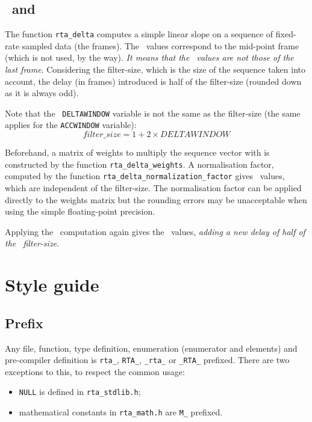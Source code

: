 \documentclass[a4paper, twoside]{article}
\begin{document}
\subsection{\Del\ and \ddel\  \mfcc}
\label{sec:delta_mfcc}

The function \texttt{rta\_delta} computes a simple linear slope on a
sequence of fixed-rate sampled data (the frames). The \del\ values
correspond to the mid-point frame (which is not used, by the
way). \emph{It means that the \del\ values are not those of the last
  frame}. Considering the filter-size, which is the size of the
sequence taken into account, the delay (in frames) introduced is half
of the filter-size (rounded down as it is always odd).

Note that the \htk\ \texttt{DELTAWINDOW} variable is not the same as
the filter-size (the same applies for the \texttt{ACCWINDOW}
variable):
$$ filter\_size = 1 + 2 \times DELTAWINDOW $$

Beforehand, a matrix of weights to multiply the sequence vector with
is constructed by the function \texttt{rta\_delta\_weights}. A
normalisation factor, computed by the function
\texttt{rta\_delta\_normalization\_factor} gives \del\ values, which
are independent of the filter-size. The normalisation factor can be
applied directly to the weights matrix but the rounding errors may be
unacceptable when using the simple floating-point precision.

Applying the \del\ computation again gives the \ddel\ values,
\emph{adding a new delay of half of the \ddel\ filter-size}.

\section{Style guide}
\label{sec:style_guide}

\subsection{Prefix}
\label{sec:prefix}

Any file, function, type definition, enumeration (enumerator and
elements) and pre-compiler definition is \texttt{rta\_},
\texttt{RTA\_}, \texttt{\_rta\_} or \texttt{\_RTA\_} prefixed. There are
two exceptions to this, to respect the common usage:
\begin{itemize}
\item \texttt{NULL} is defined in \texttt{rta\_stdlib.h};
\item mathematical constants in \texttt{rta\_math.h} are \texttt{M\_}
  prefixed.
\end{itemize}
\end{document}
